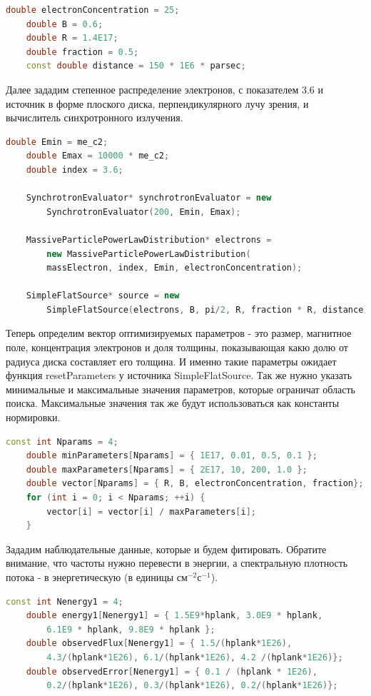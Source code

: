 \begin{lstlisting}[language=c++]
    double electronConcentration = 25;
    double B = 0.6;
    double R = 1.4E17;
    double fraction = 0.5;
    const double distance = 150 * 1E6 * parsec;
\end{lstlisting}
Далее зададим степенное распределение электронов, с показателем 3.6 и источник в форме плоского диска, перпендикулярного лучу зрения, и вычислитель синхротронного излучения.
\begin{lstlisting}[language=c++]
    double Emin = me_c2;
    double Emax = 10000 * me_c2;
    double index = 3.6;
	
    SynchrotronEvaluator* synchrotronEvaluator = new
        SynchrotronEvaluator(200, Emin, Emax);

    MassiveParticlePowerLawDistribution* electrons = 
        new MassiveParticlePowerLawDistribution(
        massElectron, index, Emin, electronConcentration);

    SimpleFlatSource* source = new
        SimpleFlatSource(electrons, B, pi/2, R, fraction * R, distance);
\end{lstlisting}
Теперь определим вектор оптимизируемых параметров - это размер, магнитное поле, концентрация электронов и доля толщины, показывающая какю долю от радиуса диска составляет его толщина. И именно такие параметры ожидает функция resetParameters у источника SimpleFlatSource. Так же нужно указать минимальные и максимальные значения параметров, которые ограничат область поиска. Максимальные значения так же будут использоваться как константы нормировки.
\begin{lstlisting}[language=c++]
    const int Nparams = 4;
    double minParameters[Nparams] = { 1E17, 0.01, 0.5, 0.1 };
    double maxParameters[Nparams] = { 2E17, 10, 200, 1.0 };
    double vector[Nparams] = { R, B, electronConcentration, fraction};
    for (int i = 0; i < Nparams; ++i) {
	    vector[i] = vector[i] / maxParameters[i];
    }
\end{lstlisting}
Зададим наблюдательные данные, которые и будем фитировать. Обратите внимание, что частоты нужно перевести в энергии, а спектральную плотность потока - в энергетическую (в единицы $\text{см}^{-2}\text{с}^{-1}$).
\begin{lstlisting}[language=c++]
    const int Nenergy1 = 4;
    double energy1[Nenergy1] = { 1.5E9*hplank, 3.0E9 * hplank, 
    	6.1E9 * hplank, 9.8E9 * hplank };
    double observedFlux[Nenergy1] = { 1.5/(hplank*1E26), 
    	4.3/(hplank*1E26), 6.1/(hplank*1E26), 4.2 /(hplank*1E26)};
    double observedError[Nenergy1] = { 0.1 / (hplank * 1E26), 
    	0.2/(hplank*1E26), 0.3/(hplank*1E26), 0.2/(hplank*1E26)};
\end{lstlisting}
